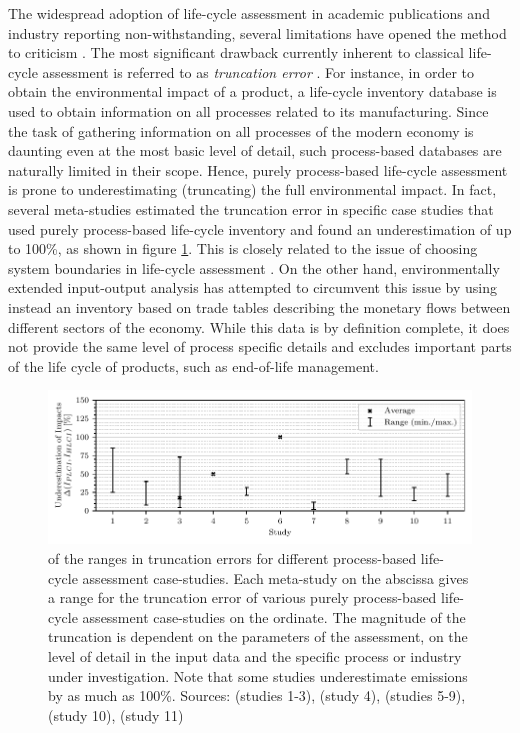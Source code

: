 \documentclass{article}
\begin{document}
    The widespread adoption of life-cycle assessment in academic publications and industry reporting non-withstanding, several limitations have opened the method to criticism \cite{reap_survey_2008}\cite{reap_survey_2008-1}\cite{finnveden_limitations_2000}\cite{plevin_using_2014}. The most significant drawback currently inherent to classical life-cycle assessment is referred to as \textit{truncation error} \cite{crawford_hybrid_2018}. For instance, in order to obtain the environmental impact of a product, a life-cycle inventory database is used to obtain information on all processes related to its manufacturing. Since the task of gathering information on all processes of the modern economy is daunting even at the most basic level of detail, such process-based databases are naturally limited in their scope. Hence, purely process-based life-cycle assessment is prone to underestimating (truncating) the full environmental impact. In fact, several meta-studies estimated the truncation error in specific case studies that used purely process-based life-cycle inventory and found an underestimation of up to 100\%, as shown in figure \ref{fig:underestimation}. This is closely related to the issue of choosing system boundaries in life-cycle assessment \cite{teh_hybrid_2017}. On the other hand, environmentally extended input-output analysis has attempted to circumvent this issue by using instead an inventory based on trade tables describing the monetary flows between different sectors of the economy. While this data is by definition complete, it does not provide the same level of process specific details and excludes important parts of the life cycle of products, such as end-of-life management.
    
    \begin{figure}[h!]
    	\centering
    	\includegraphics[width=\textwidth]{figures/1_range_of_underestimation.pdf}
    	\caption{ of the ranges in truncation errors for different process-based life-cycle assessment case-studies. Each meta-study on the abscissa gives a range for the truncation error of various purely process-based life-cycle assessment case-studies on the ordinate. The magnitude of the truncation is dependent on the parameters of the assessment, on the level of detail in the input data and the specific process or industry under investigation. Note that some studies underestimate emissions by as much as 100\%. Sources: \cite{rebitzer_input-output_2002} (studies 1-3), \cite{lenzen_errors_2000} (study 4), \cite{agez_hybridization_2020} (studies 5-9), \cite{agez_correcting_2022} (study 10), \cite{agez_lifting_2019} (study 11)}
    	\label{fig:underestimation}
    \end{figure}
    
\end{document}
